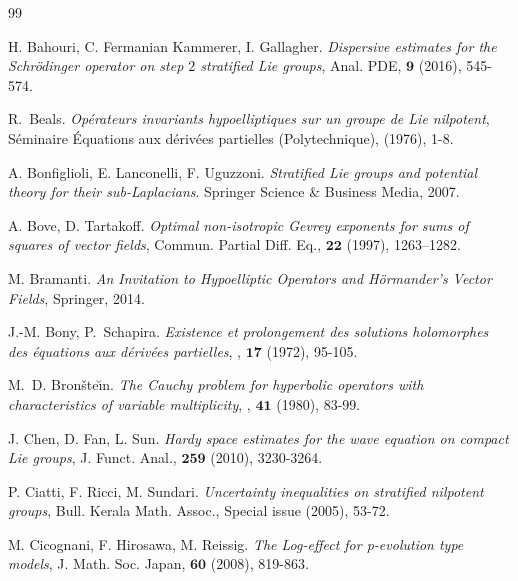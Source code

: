 \documentclass[12pt,oneside,a4paper]{book}
\numberwithin{equation}{section}     %
\theoremstyle{plain}
\theoremstyle{definition}
\begin{document}



\clearpage

\begin{thebibliography}{99}
	
	H. Bahouri, C. Fermanian Kammerer, I. Gallagher.
	\emph{Dispersive estimates for the Schr\"odinger operator on step $2$ stratified Lie groups},
	Anal. PDE, $\mathbf{9}$ (2016), 545-574.
	
	R.~Beals.
	\emph{Op\'erateurs invariants hypoelliptiques sur un groupe de Lie nilpotent},
	S\'eminaire \'Equations aux d\'eriv\'ees partielles (Polytechnique), (1976), 1-8.
	
	A. Bonfiglioli, E. Lanconelli, F. Uguzzoni. 
	\emph{Stratified Lie groups and potential theory for their sub-Laplacians}.
	Springer Science \& Business Media, 2007.
	
	A. Bove, D. Tartakoff. 
	\emph{Optimal non-isotropic Gevrey exponents for sums of squares of vector fields},
	Commun. Partial Diff. Eq., $\mathbf{22}$ (1997), 1263–1282.
	
	M. Bramanti.
	\emph{An Invitation to Hypoelliptic Operators and H\"ormander's Vector Fields},
	Springer, 2014.
	
	J.-M. Bony, P.~Schapira.
	\emph{Existence et prolongement des solutions holomorphes des {\'e}quations
		aux d{\'e}riv{\'e}es partielles},
	, $\mathbf{17}$ (1972), 95-105.
	
	M.~D. Bron{\v{s}}te{\u\i}n.
	\emph{The {C}auchy problem for hyperbolic operators with characteristics of
		variable multiplicity},
	, $\mathbf{41}$ (1980), 83-99.
	
	J. Chen, D. Fan, L. Sun.
	\emph{Hardy space estimates for the wave equation on compact Lie groups},
	J. Funct. Anal., $\mathbf{259}$ (2010), 3230-3264. 
	
	P. Ciatti, F. Ricci, M. Sundari.
	\emph{Uncertainty inequalities on stratified nilpotent groups},
	Bull. Kerala Math. Assoc., Special issue (2005), 53-72.
	
	M. Cicognani, F. Hirosawa, M. Reissig.
	\emph{The Log-effect for p-evolution type models}, 
	{J. Math. Soc. Japan}, $\mathbf{60}$ (2008), 819-863.
	

\end{thebibliography}
\end{document}
